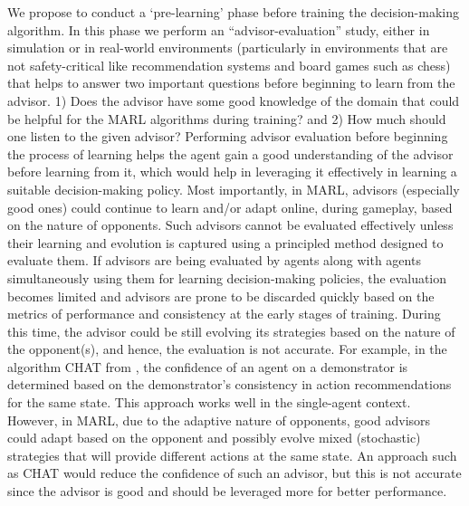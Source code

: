 \documentclass[jair, twoside,11pt,theapa]{article}
\begin{document}
We propose to conduct a `pre-learning' phase before training  the decision-making algorithm. In this phase we perform an ``advisor-evaluation'' study,  either in simulation or in real-world environments (particularly in environments that are not safety-critical like recommendation systems and board games such as chess) that helps to answer two important questions before beginning to learn from the advisor. 1) Does the advisor have some good knowledge of the domain that could be helpful for the MARL algorithms during training? and 2) How much should one listen to the given advisor? Performing advisor evaluation before beginning the process of learning helps the agent gain a good understanding of the advisor before learning from it, which would help in leveraging it effectively in learning a suitable decision-making policy. Most importantly, in MARL, advisors (especially good ones) could continue to learn and/or adapt online, during gameplay, based on the nature of opponents. Such advisors cannot be evaluated effectively unless their learning and evolution is captured using a principled method designed to evaluate them. If advisors are being evaluated by agents along with agents simultaneously using them for learning decision-making policies, the evaluation becomes limited and advisors are prone to be discarded quickly based on the metrics of performance and consistency at the early stages of training. During this time, the advisor could be still evolving its strategies based on the nature of the opponent(s), and hence, the evaluation is not accurate. 
For example, in the algorithm CHAT from  \citet{wang2017improving}, the confidence of an agent on a demonstrator is determined based on the demonstrator's consistency in action recommendations for the same state. This approach works well in the single-agent context. However, in MARL, due to the adaptive nature of opponents, good advisors could adapt based on the opponent and possibly evolve mixed (stochastic) strategies that will provide different actions at the same state. An approach such as CHAT would reduce the confidence of such an advisor, but this is not accurate since the advisor is good and should be leveraged more for better performance. 

\end{document}

